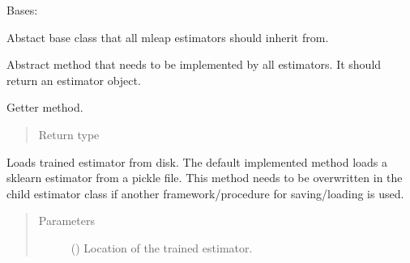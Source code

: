 \documentclass[letterpaper,10pt,english]{sphinxmanual}
\begin{document}
\begin{fulllineitems}
\label{\detokenize{estimators:mleap.estimators.mleap_estimator.MleapEstimator}}
Bases: 

Abstact base class that all mleap estimators should inherit from.

\begin{fulllineitems}
\label{\detokenize{estimators:mleap.estimators.mleap_estimator.MleapEstimator.build}}
Abstract method that needs to be implemented by all estimators. 
It should return an estimator object.

\end{fulllineitems}


\begin{fulllineitems}
\label{\detokenize{estimators:mleap.estimators.mleap_estimator.MleapEstimator.get_trained_model}}
Getter method.
\begin{quote}\begin{description}
\item[{Return type}] \leavevmode
{}

\end{description}\end{quote}

\end{fulllineitems}


\begin{fulllineitems}
\label{\detokenize{estimators:mleap.estimators.mleap_estimator.MleapEstimator.load}}
Loads trained estimator from disk.
The default implemented method loads a sklearn estimator from a pickle file. 
This method needs to be overwritten in the child estimator class if another 
framework/procedure for saving/loading is used.
\begin{quote}\begin{description}
\item[{Parameters}] \leavevmode
{} () \textendash{} Location of the trained estimator.


\end{description}
\end{quote}
\end{fulllineitems}
\end{fulllineitems}
\end{document}
